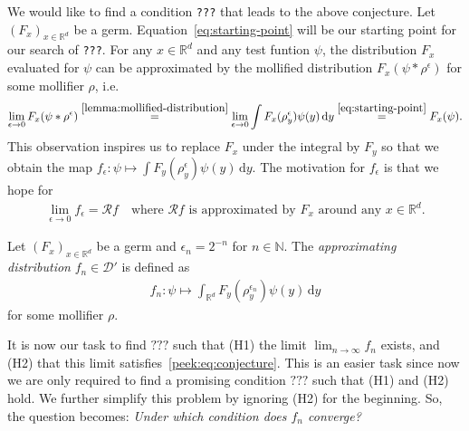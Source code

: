We would like to find a condition \texttt{???} that leads to the above conjecture. Let \({(F_x)}_{x \in \mathbb{R}^d}\) be a germ. Equation~\eqref{eq:starting-point} will be our starting point for our search of \texttt{???}. For any \(x \in \mathbb{R}^d\) and any test funtion \({\psi}\), the distribution \(F_x\) evaluated for \({\psi}\) can be approximated by the mollified distribution \(F_x(\psi * \rho^\epsilon)\) for some mollifier \({\rho}\), i.e.
\begin{align*}
    \lim_{\epsilon \to 0}F_x(\psi * \rho^\epsilon) \overset{\eqref{lemma:mollified-distribution}}{=} \lim_{\epsilon \to 0} \int F_x(\rho_y^\epsilon) \psi(y)\, \mathrm{d}y \overset{\eqref{eq:starting-point}}{=} F_x(\psi).
\end{align*}
This observation inspires us to replace \(F_x\) under the integral by \(F_y\) so that we obtain the map \(f_\epsilon: \psi \mapsto \int F_y(\rho_y^\epsilon) \psi(y)\, \mathrm{d}y\). The motivation for \(f_{\epsilon}\) is that we hope for 
\begin{align*}
    \lim_{\epsilon \to 0}f_\epsilon = \mathcal{R}f \quad \text{where } \mathcal{R}f \text{ is approximated by \(F_x\) around any \(x \in \mathbb{R}^d\)}.
\end{align*}
\begin{definition}\label{def:approximating-distributions}
        Let \({(F_x)}_{x \in \mathbb{R}^d}\) be a germ and \(\epsilon_n = 2^{-n}\) for \(n \in \mathbb{N}\). The \emph{approximating distribution} \(f_n \in \mathcal{D}'\) is defined as 
        \begin{align*}
                f_n: \psi \mapsto \int_{\mathbb{R}^d} F_y(\rho_y^{\epsilon_n}) \psi(y)\, \mathrm{d}y
        \end{align*}
        for some mollifier \({\rho}\). 
\end{definition}
It is now our task to find \(\texttt{???}\) such that (H1) the limit \(\lim_{n \to \infty}f_n\) exists, and (H2) that this limit satisfies~\eqref{peek:eq:conjecture}. This is an easier task since now we are only required to find a promising condition \(\texttt{???}\) such that (H1) and (H2) hold. We further simplify this problem by ignoring (H2) for the beginning. So, the question becomes: \emph{Under which condition does \(f_n\) converge?}

